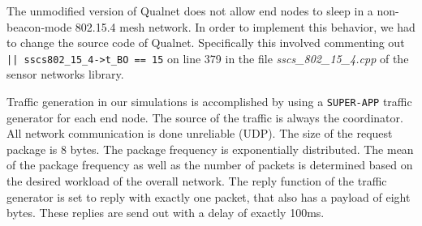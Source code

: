 The unmodified version of Qualnet does not allow end nodes to sleep in a non-beacon-mode 802.15.4 mesh network. In order to implement this behavior, we had to change the source code of Qualnet. Specifically this involved commenting out \texttt{|| sscs802\_15\_4->t\_BO == 15} on line 379 in the file \textit{sscs\_802\_15\_4.cpp} of the sensor networks library.

Traffic generation in our simulations is accomplished by using a \texttt{SUPER-APP} traffic generator for each end node. The source of the traffic is always the coordinator. All network communication is done unreliable (UDP). The size of the request package is 8 bytes. The package frequency is exponentially distributed. The mean of the package frequency as well as the number of packets is determined based on the desired workload of the overall network. The reply function of the traffic generator is set to reply with exactly one packet, that also has a payload of eight bytes. These replies are send out with a delay of exactly 100ms.


